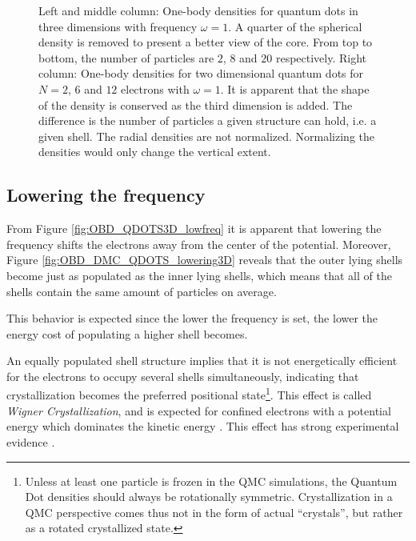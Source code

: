 \begin{figure}
\begin{center}
\begin{tabular}{cc|c}
  \end{tabular}
  \caption{Left and middle column: One-body densities for quantum dots in three dimensions with frequency $\omega=1$. A quarter of the spherical density is removed to present a better view of the core. From top to bottom, the number of particles are $2$, $8$ and $20$ respectively. Right column: One-body densities for two dimensional quantum dots for $N=2$, $6$ and $12$ electrons with $\omega=1$. It is apparent that the  shape of the density is conserved as the third dimension is added. The difference is the number of particles a given structure can hold, i.e. a given shell. The radial densities are not normalized. Normalizing the densities would only change the vertical extent.}
  \label{fig:OBD_QDOTS3D_highfreq}
 \end{center}
\end{figure}

\captionsetup[subfloat]{labelformat=parens}

\clearpage

\subsection{Lowering the frequency}


From Figure \ref{fig:OBD_QDOTS3D_lowfreq} it is apparent that lowering the frequency shifts the electrons away from the center of the potential. Moreover, Figure \ref{fig:OBD_DMC_QDOTS_lowering3D} reveals that the outer lying shells become just as populated as the inner lying shells, which means that all of the shells contain the same amount of particles on average.

This behavior is expected since the lower the frequency is set, the lower the energy cost of populating a higher shell becomes. 

An equally populated shell structure implies that it is not energetically efficient for the electrons to occupy several shells simultaneously, indicating that crystallization becomes the preferred positional state\footnote{Unless at least one particle is frozen in the QMC simulations, the Quantum Dot densities should always be rotationally symmetric. Crystallization in a QMC perspective comes thus not in the form of actual ``crystals'', but rather as a rotated crystallized state.}. This effect is called \textit{Wigner Crystallization}, and is expected for confined electrons with a potential energy which dominates the kinetic energy \cite{WignerMolecule}. This effect has strong experimental evidence \cite{WignerCrystal, WignerCrystal2}. 

